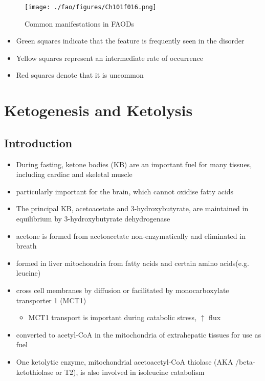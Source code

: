 \documentclass{scrartcl}
\begin{document}
\begin{figure}[htbp]
\centering
\texttt{[image: ./fao/figures/Ch101f016.png]}
\caption{\label{fig:org0c811a9}
Common manifestations in FAODs}
\end{figure}

\begin{itemize}
\item Green squares indicate that the feature is frequently seen in the disorder
\item Yellow squares represent an intermediate rate of occurrence
\item Red squares denote that it is uncommon
\end{itemize}
\section{Ketogenesis and Ketolysis}
\label{sec:orgd5c34ba}
\subsection{Introduction}
\label{sec:orgd7392c2}

\begin{itemize}
\item During fasting, ketone bodies (KB) are an important fuel for many
tissues, including cardiac and skeletal muscle
\item particularly important for the brain, which cannot oxidise fatty acids
\item The principal KB, acetoacetate and 3-hydroxybutyrate, are
maintained in equilibrium by 3-hydroxybutyrate dehydrogenase
\item acetone is formed from acetoacetate non-enzymatically and eliminated in breath
\item formed in liver mitochondria from fatty acids and certain amino acids(e.g. leucine)
\item cross cell membranes by diffusion or facilitated by monocarboxylate transporter 1 (MCT1)
\begin{itemize}
\item MCT1 transport is important during catabolic stress, \(\uparrow\) flux
\end{itemize}
\item converted to acetyl-CoA in the mitochondria of extrahepatic tissues for use as fuel
\item One ketolytic enzyme, mitochondrial acetoacetyl-CoA thiolase (AKA
/beta-ketothiolase or T2), is also involved in isoleucine catabolism
\end{itemize}
\end{document}
